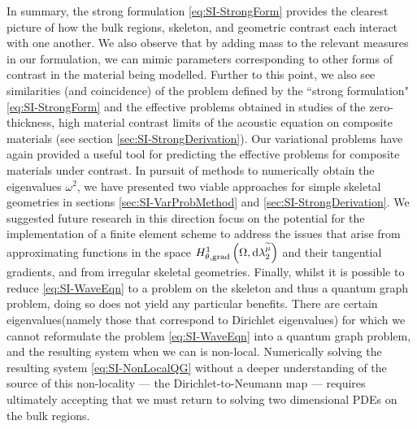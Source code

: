 In summary, the strong formulation \eqref{eq:SI-StrongForm} provides the clearest picture of how the bulk regions, skeleton, and geometric contrast each interact with one another.
We also observe that by adding mass to the relevant measures in our formulation, we can mimic parameters corresponding to other forms of contrast in the material being modelled.
Further to this point, we also see similarities (and coincidence) of the problem defined by the ``strong formulation" \eqref{eq:SI-StrongForm} and the effective problems obtained in studies of the zero-thickness, high material contrast limits of the acoustic equation on composite materials (see section \ref{sec:SI-StrongDerivation}).
Our variational problems have again provided a useful tool for predicting the effective problems for composite materials under contrast.
In pursuit of methods to numerically obtain the eigenvalues $\omega^2$, we have presented two viable approaches for simple skeletal geometries in sections \ref{sec:SI-VarProbMethod} and \ref{sec:SI-StrongDerivation}.
We suggested future research in this direction focus on the potential for the implementation of a finite element scheme to address the issues that arise from approximating functions in the space $H^1_{\theta, \mathrm{grad}}\left( \Omega, \mathrm{d}\lambda_2^{\widetilde{\mu}} \right)$ and their tangential gradients, and from irregular skeletal geometries.
Finally, whilst it is possible to reduce \eqref{eq:SI-WaveEqn} to a problem on the skeleton and thus a quantum graph problem, doing so does not yield any particular benefits.
There are certain eigenvalues(namely those that correspond to Dirichlet eigenvalues) for which we cannot reformulate the problem \eqref{eq:SI-WaveEqn} into a quantum graph problem, and the resulting system when we can is non-local.
Numerically solving the resulting system \eqref{eq:SI-NonLocalQG} without a deeper understanding of the source of this non-locality --- the Dirichlet-to-Neumann map --- requires ultimately accepting that we must return to solving two dimensional PDEs on the bulk regions.

